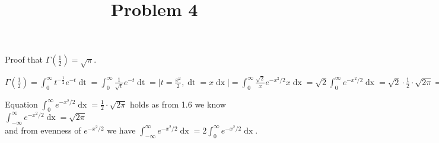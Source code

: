 \documentclass[11pt,wide]{article}
\title{Problem 4\textdegree}
\begin{document}
\maketitle
\thispagestyle{empty} 

Proof that \(\displaystyle \Gamma\left(\frac{1}{2}\right) = \sqrt{\pi}\). \\
\begin{center}
\(\displaystyle \Gamma\left(\frac{1}{2}\right) = \int_0^{\infty} t^{-\frac{1}{2}}e^{-t}\mathop{dt} = \int_0^{\infty} \frac{1}{\sqrt{t}}e^{-t} \mathop{dt} = \bigg| t=\frac{x^2}{2}, \mathop{dt} = x\mathop{dx} \bigg| = \int_0^{\infty} \frac{\sqrt{2}}{x} e^{-x^2/2} x \mathop{dx} = \sqrt{2} \int_0^{\infty} e^{-x^2/2} \mathop{dx} = \sqrt{2} \cdot \frac{1}{2} \cdot \sqrt{2\pi}= \sqrt{\pi}\) \\
\end{center}

Equation \(\displaystyle \int_0^{\infty} e^{-x^2/2} \mathop{dx} = \frac{1}{2} \cdot \sqrt{2\pi} \) holds as from 1.6 we know \(\displaystyle \int_{-\infty}^{\infty} e^{-x^2/2} \mathop{dx} = \sqrt{2\pi} \) \\
and from evenness of \(\displaystyle e^{-x^2/2} \) we have \(\displaystyle \int_{-\infty}^{\infty} e^{-x^2/2}\mathop{dx} = 2 \int_0^{\infty} e^{-x^2/2} \mathop{dx} \).
\end{document}
